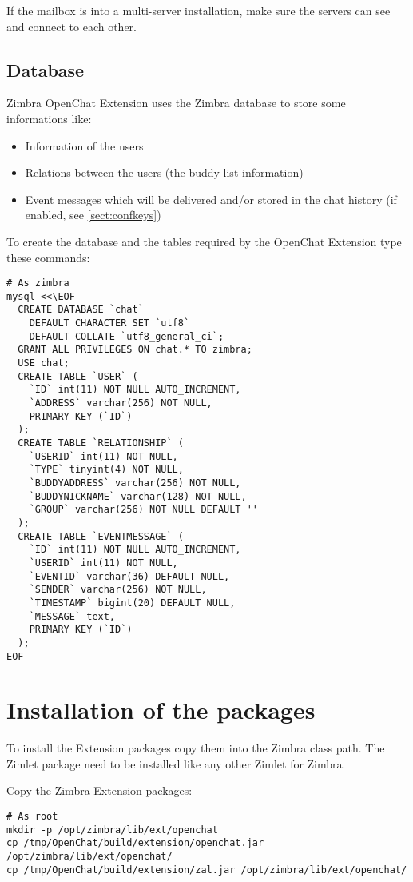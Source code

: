     If the mailbox is into a multi-server installation, make sure the servers can see and connect to each other.

\subsection{Database}

    Zimbra OpenChat Extension uses the Zimbra database to store some informations like:
    \begin{itemize}
        \item Information of the users
        \item Relations between the users (the buddy list information)
        \item Event messages which will be delivered and/or stored in the chat history (if enabled, see \autoref{sect:confkeys})
    \end{itemize}

    To create the database and the tables required by the OpenChat Extension type these commands:
    \begin{verbatim}
# As zimbra
mysql <<\EOF
  CREATE DATABASE `chat`
    DEFAULT CHARACTER SET `utf8`
    DEFAULT COLLATE `utf8_general_ci`;
  GRANT ALL PRIVILEGES ON chat.* TO zimbra;
  USE chat;
  CREATE TABLE `USER` (
    `ID` int(11) NOT NULL AUTO_INCREMENT,
    `ADDRESS` varchar(256) NOT NULL,
    PRIMARY KEY (`ID`)
  );
  CREATE TABLE `RELATIONSHIP` (
    `USERID` int(11) NOT NULL,
    `TYPE` tinyint(4) NOT NULL,
    `BUDDYADDRESS` varchar(256) NOT NULL,
    `BUDDYNICKNAME` varchar(128) NOT NULL,
    `GROUP` varchar(256) NOT NULL DEFAULT ''
  );
  CREATE TABLE `EVENTMESSAGE` (
    `ID` int(11) NOT NULL AUTO_INCREMENT,
    `USERID` int(11) NOT NULL,
    `EVENTID` varchar(36) DEFAULT NULL,
    `SENDER` varchar(256) NOT NULL,
    `TIMESTAMP` bigint(20) DEFAULT NULL,
    `MESSAGE` text,
    PRIMARY KEY (`ID`)
  );
EOF
    \end{verbatim}

\section{Installation of the packages}
\label{sect:installpkgs}

    To install the Extension packages copy them into the Zimbra class path. The Zimlet package need to be installed like
    any other Zimlet for Zimbra.

    Copy the Zimbra Extension packages:
    \begin{verbatim}
# As root
mkdir -p /opt/zimbra/lib/ext/openchat
cp /tmp/OpenChat/build/extension/openchat.jar /opt/zimbra/lib/ext/openchat/
cp /tmp/OpenChat/build/extension/zal.jar /opt/zimbra/lib/ext/openchat/
    \end{verbatim}

